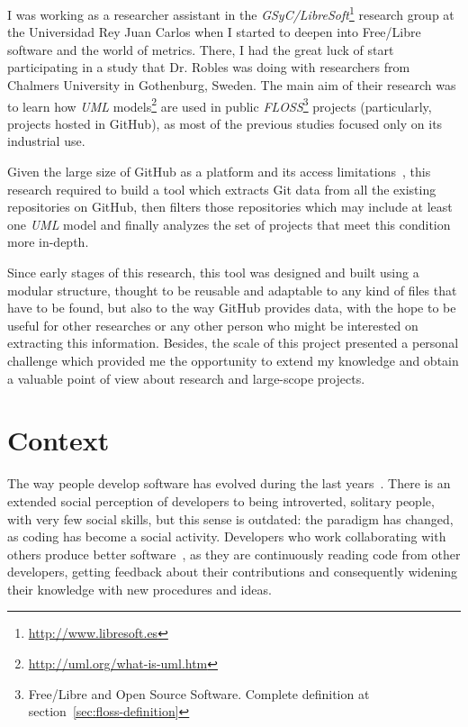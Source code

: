 \documentclass[a4paper, 12pt]{book}
\begin{document}
I was working as a researcher assistant in the \emph{GSyC/LibreSoft}\footnote{\url{http://www.libresoft.es}} research group at the Universidad
Rey Juan Carlos when I started to deepen into Free/Libre software and the world of metrics.
There, I had the great luck of start participating in a study that
Dr. Robles was doing with researchers from Chalmers University in Gothenburg, Sweden. The main aim of their research was to
learn how \emph{UML} models\footnote{\url{http://uml.org/what-is-uml.htm}} are used in public
\emph{FLOSS}\footnote{Free/Libre and Open Source Software. Complete definition at section~\ref{sec:floss-definition}} projects
(particularly, projects hosted in GitHub), as most of the previous studies focused only on its industrial use.

Given the large size of GitHub as a platform and its access limitations~\cite{kalliamvakou2014promises}, this research required to build a tool which extracts
Git data from all the existing repositories on GitHub, then filters those repositories which may include at least one
\emph{UML} model and finally analyzes the set of projects that meet this condition more in-depth.

Since early stages of this research, this tool was designed and built using a modular structure, thought to be reusable
and adaptable to any kind of files that have to be found, but also to the way GitHub provides data, with the hope to be useful
for other researches or any other person who might be interested on extracting this information. Besides, the scale of this project
presented a personal challenge which provided me the opportunity to extend my knowledge and obtain a valuable point of
view about research and large-scope projects.

\section{Context}
\label{sec:context}

The way people develop software has evolved during the last years~\cite{tepper2003rise}. There is an extended social perception of developers to
being introverted, solitary people, with very few social skills, but this sense is outdated: the paradigm has changed,
as coding has become a social activity. Developers who work collaborating with others produce better software~\cite{Vasilescu:2014:SDH:2556420.2556833,moreno2016examining},
as they are continuously reading code from other developers, getting feedback about their contributions and consequently
widening their knowledge with new procedures and ideas.
\end{document}
